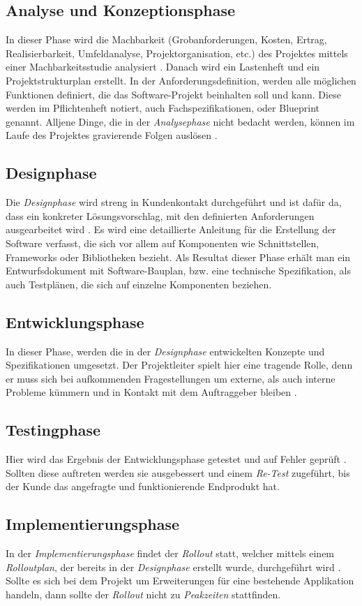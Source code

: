 \subsection{Analyse und Konzeptionsphase}
In dieser Phase wird die Machbarkeit (Grobanforderungen, Kosten, Ertrag, Realisierbarkeit, Umfeldanalyse, Projektorganisation, etc.) des Projektes mittels einer Machbarkeitsstudie analysiert \cite{pm-wasserfall-ionos}. Danach wird ein Lastenheft und ein Projektstrukturplan erstellt. In der Anforderungsdefinition, werden alle möglichen Funktionen definiert, die das Software-Projekt beinhalten soll und kann. Diese werden im Pflichtenheft notiert, auch Fachspezifikationen, oder Blueprint genannt. Alljene Dinge, die in der \textit{Analysephase} nicht bedacht werden, können im Laufe des Projektes gravierende Folgen auslösen \cite{pm-wasserfall-online}.
\subsection{Designphase}
Die \textit{Designphase} wird streng in Kundenkontakt durchgeführt \cite{pm-wasserfall-online} und ist dafür da, dass ein konkreter Lösungsvorschlag, mit den definierten Anforderungen ausgearbeitet wird \cite{pm-wasserfall-ionos}. Es wird eine detaillierte Anleitung für die Erstellung der Software verfasst, die sich vor allem auf Komponenten wie Schnittstellen, Frameworks oder Bibliotheken bezieht. Als Resultat dieser Phase erhält man ein Entwurfsdokument mit Software-Bauplan, bzw. eine technische Spezifikation, als auch Testplänen, die sich auf einzelne Komponenten beziehen.
\subsection{Entwicklungsphase}
In dieser Phase, werden die in der \textit{Designphase} entwickelten Konzepte und Spezifikationen umgesetzt. Der Projektleiter spielt hier eine tragende Rolle, denn er muss sich bei aufkommenden Fragestellungen um externe, als auch interne Probleme kümmern und in Kontakt mit dem Auftraggeber bleiben \cite{pm-wasserfall-online}. 
\subsection{Testingphase}
Hier wird das Ergebnis der Entwicklungsphase getestet und auf Fehler geprüft \cite{pm-wasserfall-online}. Sollten diese auftreten werden sie ausgebessert und einem \textit{Re-Test} zugeführt, bis der Kunde das angefragte und funktionierende Endprodukt hat.
\subsection{Implementierungsphase}
In der \textit{Implementierungsphase} findet der \textit{Rollout} statt, welcher mittels einem \textit{Rolloutplan}, der bereits in der \textit{Designphase} erstellt wurde, durchgeführt wird \cite{pm-wasserfall-online}. Sollte es sich bei dem Projekt um Erweiterungen für eine bestehende Applikation handeln, dann sollte der \textit{Rollout} nicht zu \textit{Peakzeiten} stattfinden.
